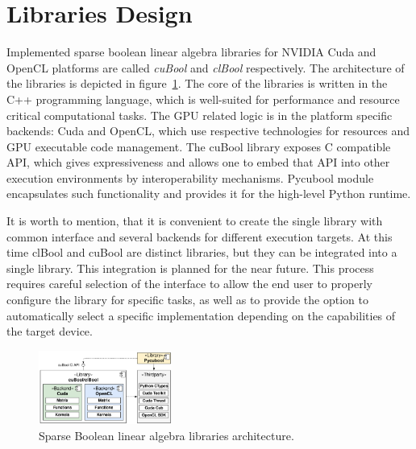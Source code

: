 \section{Libraries Design}



Implemented sparse boolean linear algebra libraries for NVIDIA Cuda and OpenCL platforms  are called \textit{cuBool} and  \textit{clBool} respectively.
The architecture of the libraries is depicted in figure~\ref{fig:generic_architecture}.
The core of the libraries is written in the C++ programming language, which is well-suited for performance and resource critical computational tasks.
The GPU related logic is in the platform specific backends: Cuda and OpenCL, which use respective technologies for resources and GPU executable code management.
The cuBool library exposes C compatible API, which gives expressiveness and allows one to embed that API into other execution environments by interoperability mechanisms.
Pycubool module encapsulates such functionality and provides it for the high-level Python runtime.

It is worth to mention, that it is convenient to create the single library with common interface and several backends for different execution targets.
At this time clBool and cuBool are distinct libraries, but they can be integrated into a single library.
This integration is planned for the near future.
This process requires careful selection of the interface to allow the end user to properly configure the library for specific tasks, as well as to provide the option to automatically select a specific implementation depending on the capabilities of the target device.

\begin{figure}[t]
    \centering
    \includegraphics[width=0.39\textwidth]{generic_architecture.png}
    \caption{Sparse Boolean linear algebra libraries architecture.}
    \label{fig:generic_architecture}
\end{figure}

